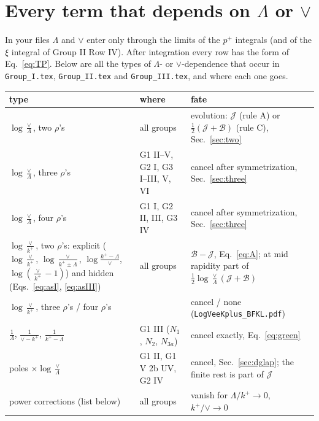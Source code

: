 \documentclass[10pt]{article}
\numberwithin{equation}{section}
\begin{document}
\section{Every term that depends on $\Lambda$ or $\vee$}\label{sec:scales}
In your files $\Lambda$ and $\vee$ enter only through the limits of the $p^+$ integrals (and of the $\xi$ integral of Group II Row IV). After integration every row has the form of Eq.~\eqref{eq:TP}. Below are all the types of $\Lambda$- or $\vee$-dependence that occur in \texttt{Group\_I.tex}, \texttt{Group\_II.tex} and \texttt{Group\_III.tex}, and where each one goes.
\begin{table}[H]\centering\small
\begin{tabular}{@{}p{}p{}p{}@{}}\toprule
type & where & fate\\\midrule
$\log\frac{\vee}{\Lambda}$, two $\rho$'s & all groups & evolution: $\mathcal J$ (rule A) or $\frac12(\mathcal J+\mathcal B)$ (rule C), Sec.~\ref{sec:two}\\
$\log\frac{\vee}{\Lambda}$, three $\rho$'s & G1 II--V, G2 I, G3 I--III, V, VI & cancel after symmetrization, Sec.~\ref{sec:three}\\
$\log\frac{\vee}{\Lambda}$, four $\rho$'s & G1 I, G2 II, III, G3 IV & cancel after symmetrization, Sec.~\ref{sec:three}\\
$\log\frac{\vee}{k^+}$, two $\rho$'s: explicit ($\log\frac{\vee}{k^+}$, $\log\frac{\vee}{k^+\pm\Lambda}$, $\log\frac{k^+-\Lambda}{\vee}$, $\log(\frac{\vee}{k^+}-1)$) and hidden (Eqs.~\eqref{eq:asI}, \eqref{eq:asIII}) & all groups & $\mathcal B-\mathcal J$, Eq.~\eqref{eq:A}; at mid rapidity part of $\frac12\log\frac{\vee}{\Lambda}(\mathcal J+\mathcal B)$\\
$\log\frac{\vee}{k^+}$, three $\rho$'s / four $\rho$'s & & cancel / none (\texttt{LogVeeKplus\_BFKL.pdf})\\
$\frac1\Lambda$, $\frac{1}{\vee-k^+}$, $\frac{1}{k^+-\Lambda}$ & G1 III ($N_1$, $N_2$, $N_{3a}$) & cancel exactly, Eq.~\eqref{eq:green}\\
poles $\times\log\frac{\vee}{\Lambda}$ & G1 II, G1 V 2b UV, G2 IV & cancel, Sec.~\ref{sec:dglap}; the finite rest is part of $\mathcal J$\\
power corrections (list below) & all groups & vanish for $\Lambda/k^+\to0$, $k^+/\vee\to0$\\\bottomrule
\end{tabular}
\end{table}
\end{document}

